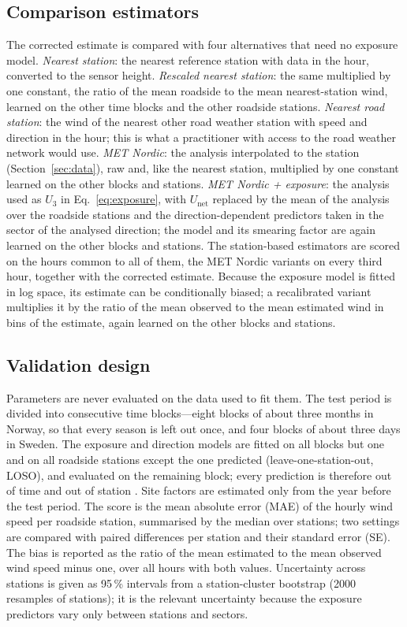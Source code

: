 \subsection{Comparison estimators}
\label{sec:baselines}
The corrected estimate is compared with four alternatives that need no exposure model. \emph{Nearest station}: the nearest reference station with data in the hour, converted to the sensor height. \emph{Rescaled nearest station}: the same multiplied by one constant, the ratio of the mean roadside to the mean nearest-station wind, learned on the other time blocks and the other roadside stations. \emph{Nearest road station}: the wind of the nearest other road weather station with speed and direction in the hour; this is what a practitioner with access to the road weather network would use. \emph{MET Nordic}: the analysis interpolated to the station (Section~\ref{sec:data}), raw and, like the nearest station, multiplied by one constant learned on the other blocks and stations. \emph{MET Nordic + exposure}: the analysis used as $U_3$ in Eq.~\eqref{eq:exposure}, with $U_\mathrm{net}$ replaced by the mean of the analysis over the roadside stations and the direction-dependent predictors taken in the sector of the analysed direction; the model and its smearing factor are again learned on the other blocks and stations. The station-based estimators are scored on the hours common to all of them, the MET Nordic variants on every third hour, together with the corrected estimate. Because the exposure model is fitted in log space, its estimate can be conditionally biased; a recalibrated variant multiplies it by the ratio of the mean observed to the mean estimated wind in bins of the estimate, again learned on the other blocks and stations.

\subsection{Validation design}
\label{sec:validation}
Parameters are never evaluated on the data used to fit them. The test period is divided into consecutive time blocks---eight blocks of about three months in Norway, so that every season is left out once, and four blocks of about three days in Sweden. The exposure and direction models are fitted on all blocks but one and on all roadside stations except the one predicted (leave-one-station-out, LOSO), and evaluated on the remaining block; every prediction is therefore out of time and out of station \citep{Roberts2017}. Site factors are estimated only from the year before the test period. The score is the mean absolute error (MAE) of the hourly wind speed per roadside station, summarised by the median over stations; two settings are compared with paired differences per station and their standard error (SE). The bias is reported as the ratio of the mean estimated to the mean observed wind speed minus one, over all hours with both values. Uncertainty across stations is given as 95\,\% intervals from a station-cluster bootstrap (2000 resamples of stations); it is the relevant uncertainty because the exposure predictors vary only between stations and sectors.

